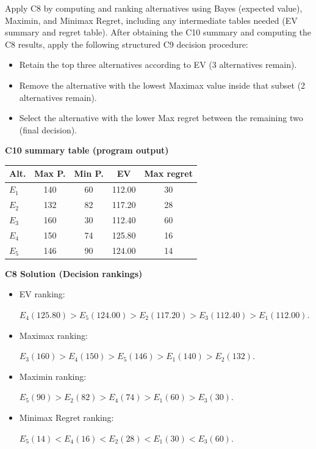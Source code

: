 \begin{ExamProblems}
		Apply C8 by computing and ranking alternatives using Bayes (expected value), Maximin, and Minimax Regret, including any intermediate tables needed (EV summary and regret table).
		After obtaining the C10 summary and computing the C8 results, apply the following structured C9 decision procedure:
		\begin{itemize}
			\item Retain the top three alternatives according to EV (3 alternatives remain).
			\item Remove the alternative with the lowest Maximax value inside that subset (2 alternatives remain).
			\item Select the alternative with the lower Max regret between the remaining two (final decision).
		\end{itemize}
		
		\vspace{0.25cm}
		
		\textbf{C10 summary table (program output)}\par
		\begin{center}
			\begin{tabular}{l c c c c}
				\hline
				Alt. & Max P. & Min P. & EV & Max regret \\
				\hline
				$E_1$ & 140 & 60 & 112.00 & 30 \\
				$E_2$ & 132 & 82 & 117.20 & 28 \\
				$E_3$ & 160 & 30 & 112.40 & 60 \\
				$E_4$ & 150 & 74 & 125.80 & 16 \\
				$E_5$ & 146 & 90 & 124.00 & 14 \\
				\hline
			\end{tabular}
		\end{center}
		
		\textbf{C8 Solution (Decision rankings)}\par
		\begin{itemize}
			\item EV ranking: \par $E_4(125.80)>E_5(124.00)>E_2(117.20)>E_3(112.40)>E_1(112.00)$.
			\item Maximax ranking:\par $E_3(160)>E_4(150)>E_5(146)>E_1(140)>E_2(132)$.
			\item Maximin ranking: \par $E_5(90)>E_2(82)>E_4(74)>E_1(60)>E_3(30)$.
			\item Minimax Regret ranking:\par $E_5(14)<E_4(16)<E_2(28)<E_1(30)<E_3(60)$.
		\end{itemize}
		

\end{ExamProblems}
